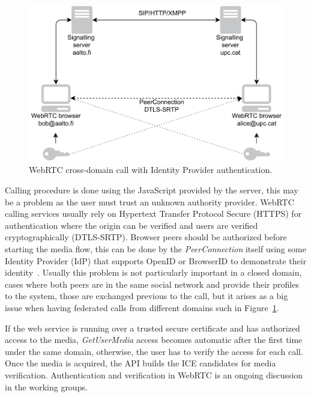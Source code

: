  \begin{figure}[h]
  \centering
    \includegraphics[width=1\textwidth]{./figures/idpWebRTCcall.pdf}
      \caption[WebRTC cross-domain call with Identity Provider authentication]{WebRTC cross-domain call with Identity Provider authentication.}
	\label{fig:idpWebRTCcall}
\end{figure}

Calling procedure is done using the JavaScript provided by the server, this may be a problem as the user must trust an unknown authority provider. WebRTC calling services usually rely on Hypertext Transfer Protocol Secure (HTTPS)  for authentication where the origin can be verified and users are verified cryptographically (DTLS-SRTP). Browser peers should be authorized before starting the media flow, this can be done by the {\it PeerConnection} itself using some Identity Provider (IdP) that supports OpenID or BrowserID to demonstrate their identity~\cite{rtcwebSecurityArchIETF}. Usually this problem is not particularly important in a closed domain, cases where both peers are in the same social network and provide their profiles to the system, those are exchanged previous to the call, but it arises as a big issue when having federated calls from different domains such in Figure~\ref{fig:idpWebRTCcall}.

If the web service is running over a trusted secure certificate and has authorized access to the media, {\it GetUserMedia} access becomes automatic after the first time under the same domain, otherwise, the user has to verify the access for each call. Once the media is acquired, the API builds the ICE candidates for media verification. Authentication and verification in WebRTC is an ongoing discussion in the working groups.

